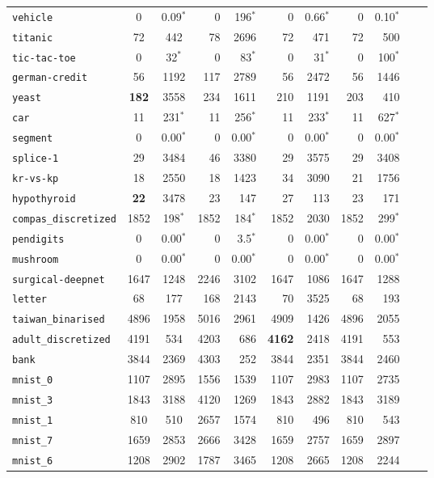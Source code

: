 \begin{tabular}{lccrrrrrrrr}
\texttt{vehicle} & 0 & 0.09$^*$ & 0 & 196$^*$ & 0 & 0.66$^*$ & 0 & 0.10$^*$\\
\texttt{titanic} & 72 & 442 & 78 & 2696 & 72 & 471 & 72 & 500\\
\texttt{tic-tac-toe} & 0 & 32$^*$ & 0 & 83$^*$ & 0 & 31$^*$ & 0 & 100$^*$\\
\texttt{german-credit} & 56 & 1192 & 117 & 2789 & 56 & 2472 & 56 & 1446\\
\texttt{yeast} & \textbf{182} & 3558 & 234 & 1611 & 210 & 1191 & 203 & 410\\
\texttt{car} & 11 & 231$^*$ & 11 & 256$^*$ & 11 & 233$^*$ & 11 & 627$^*$\\
\texttt{segment} & 0 & 0.00$^*$ & 0 & 0.00$^*$ & 0 & 0.00$^*$ & 0 & 0.00$^*$\\
\texttt{splice-1} & 29 & 3484 & 46 & 3380 & 29 & 3575 & 29 & 3408\\
\texttt{kr-vs-kp} & 18 & 2550 & 18 & 1423 & 34 & 3090 & 21 & 1756\\
\texttt{hypothyroid} & \textbf{22} & 3478 & 23 & 147 & 27 & 113 & 23 & 171\\
\texttt{compas\_discretized} & 1852 & 198$^*$ & 1852 & 184$^*$ & 1852 & 2030 & 1852 & 299$^*$\\
\texttt{pendigits} & 0 & 0.00$^*$ & 0 & 3.5$^*$ & 0 & 0.00$^*$ & 0 & 0.00$^*$\\
\texttt{mushroom} & 0 & 0.00$^*$ & 0 & 0.00$^*$ & 0 & 0.00$^*$ & 0 & 0.00$^*$\\
\texttt{surgical-deepnet} & 1647 & 1248 & 2246 & 3102 & 1647 & 1086 & 1647 & 1288\\
\texttt{letter} & 68 & 177 & 168 & 2143 & 70 & 3525 & 68 & 193\\
\texttt{taiwan\_binarised} & 4896 & 1958 & 5016 & 2961 & 4909 & 1426 & 4896 & 2055\\
\texttt{adult\_discretized} & 4191 & 534 & 4203 & 686 & \textbf{4162} & 2418 & 4191 & 553\\
\texttt{bank} & 3844 & 2369 & 4303 & 252 & 3844 & 2351 & 3844 & 2460\\
\texttt{mnist\_0} & 1107 & 2895 & 1556 & 1539 & 1107 & 2983 & 1107 & 2735\\
\texttt{mnist\_3} & 1843 & 3188 & 4120 & 1269 & 1843 & 2882 & 1843 & 3189\\
\texttt{mnist\_1} & 810 & 510 & 2657 & 1574 & 810 & 496 & 810 & 543\\
\texttt{mnist\_7} & 1659 & 2853 & 2666 & 3428 & 1659 & 2757 & 1659 & 2897\\
\texttt{mnist\_6} & 1208 & 2902 & 1787 & 3465 & 1208 & 2665 & 1208 & 2244\\

\end{tabular}
